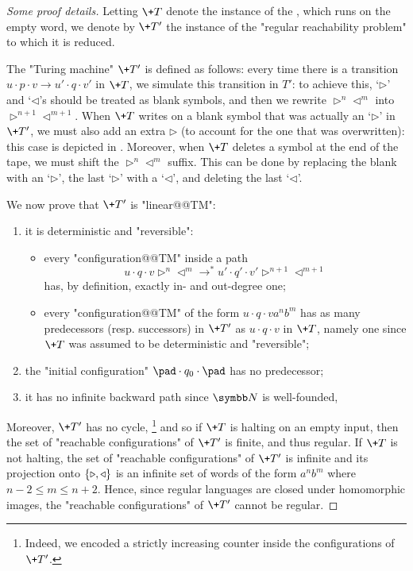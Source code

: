 \begin{proof}[Some proof details]
    Letting $\+T$ denote the instance of the , which runs on the empty word,
    we denote by $\+T'$ the instance of the "regular reachability problem" to which it
    is reduced.

    The "Turing machine" $\+T'$ is defined as follows: every time there is a transition
    $u\cdot p \cdot v \to u' \cdot q \cdot v'$ in $\+T$,
	we simulate this transition in $T'$: to achieve this, `$\triangleright$' and `$\triangleleft$'s should be treated as blank symbols,
	and then we rewrite $\triangleright^n \triangleleft^m$ into $\triangleright^{n+1}\triangleleft^{m+1}$.
	When $\+T$ writes on a blank symbol that was actually an `$\triangleright$' in $\+T'$,
	we must also add an extra $\triangleright$ (to account for the one that was overwritten):
	this case is depicted in .
	Moreover, when $\+T$ deletes a symbol at the end of the tape,
	we must shift the $\triangleright^n \triangleleft^m$ suffix. This can be done by replacing the blank
	with an `$\triangleright$', the last `$\triangleright$' with a `$\triangleleft$', and deleting the last `$\triangleleft$'.
	
    We now prove that $\+T'$ is "linear@@TM":
    \begin{enumerate}
        \item it is deterministic and "reversible":
        \begin{itemize}
            \item every "configuration@@TM" inside a path
            \[u \cdot q\cdot v \triangleright^{n} \triangleleft^{m} \to^* u' \cdot q' \cdot v' \triangleright^{n+1} \triangleleft^{m+1}\]
            has, by definition, exactly in- and out-degree one;
            \item every "configuration@@TM" of the form $u \cdot q \cdot v a^n b^m$ has as many 
            predecessors (resp. successors) in $\+T'$ as $u \cdot q \cdot v$ in $\+T$, namely one since $\+T$ was assumed to be deterministic and "reversible";
        \end{itemize}
        \item the "initial configuration" $\pad \cdot q_0 \cdot \pad$ has no predecessor;
        \item it has no infinite backward path since $\N$ is well-founded,
    \end{enumerate}
    Moreover, $\+T'$ has no cycle,%
    \footnote[][-12em]{Indeed, we encoded a strictly increasing counter inside the configurations of $\+T'$.} and so if $\+T$ is halting on an empty input, then the set of "reachable configurations" of $\+T'$ is finite, and thus regular. If $\+T$ is not halting, the set of "reachable configurations" of $\+T'$ is infinite and its projection onto $\{\triangleright,\triangleleft\}$ is an infinite set of words of the form $a^{n} b^{m}$ where $n-2 \leq m \leq n+2$. Hence, since regular languages are closed under homomorphic images, the "reachable configurations" of $\+T'$ cannot be regular.
\end{proof}


